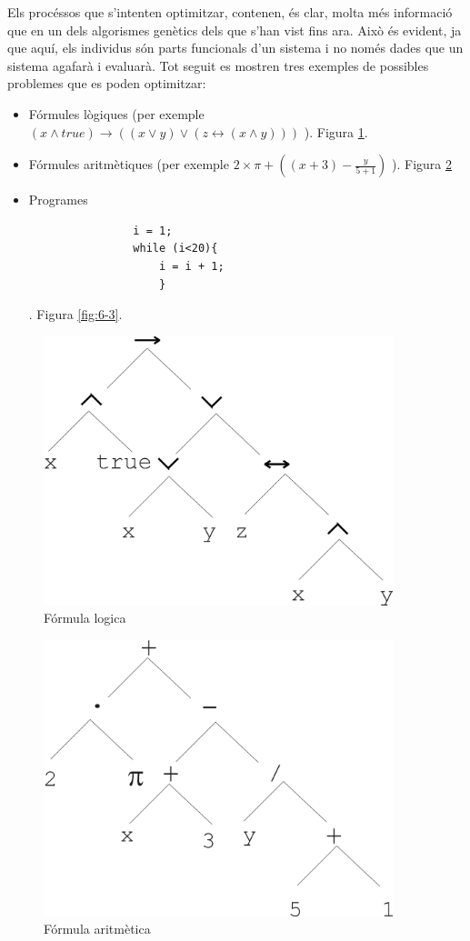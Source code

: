 Els procéssos que s'intenten optimitzar, contenen, és clar, molta més informació
que en un dels algorismes genètics dels que s'han vist fins ara.  Això és
evident, ja que aquí, els individus són parts funcionals d'un sistema i no
només dades que un sistema agafarà i evaluarà.  Tot seguit es mostren tres
exemples de possibles problemes que es poden optimitzar:

\begin{itemize}
	\item Fórmules lògiques (per exemple $ (x\land true) \rightarrow ((x \lor y)
		\lor (z \leftrightarrow ( x \land y)))$ ). Figura \ref{fig:6-2-2}.
	\item Fórmules aritmètiques (per exemple $2\times\pi+((x+3)-\frac{y}{5+1})$
		).  Figura \ref{fig:6-2-1}
	\item Programes 
		\begin{verbatim}
				i = 1;
				while (i<20){
					i = i + 1;
					}
		\end{verbatim}. Figura \ref{fig:6-3}.
\end{itemize}

\begin{figure} \centering \includegraphics[width=4in]{intro/6-2-2.jpg}
\caption{\label{fig:6-2-2}Fórmula logica}
\end{figure}

\begin{figure} \centering \includegraphics[width=4in]{intro/6-2-1.jpg}
\caption{\label{fig:6-2-1}Fórmula aritmètica}
\end{figure}

